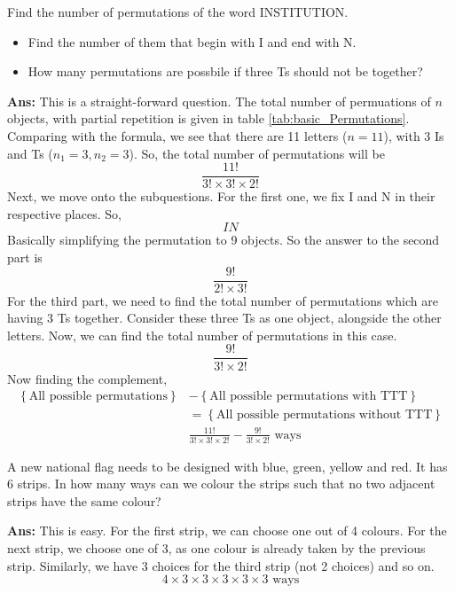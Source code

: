 \begin{example}
    Find the number of permutations of the word INSTITUTION.
    \begin{itemize}
        \item Find the number of them that begin with I and end with N.
        \item How many permutations are possbile if three Ts should not be together?
    \end{itemize}

    \textbf{Ans:} This is a straight-forward question. The total number of permuations of \mbox{$n$} objects, with partial repetition is given in table \ref{tab:basic_Permutations}. Comparing with the formula, we see that there are 11 letters (\mbox{$n=11$}), with 3 Is and Ts (\mbox{$n_1=3, n_2=3$}). So, the total number of permutations will be
    \[
        \frac{11!}{3!\times 3!\times 2!}
    \]
    Next, we move onto the subquestions. For the first one, we fix I and N in their respective places. So,
    \[
        \boxed{I}\boxed{}\boxed{}\boxed{}\boxed{}\boxed{}\boxed{}\boxed{}\boxed{}\boxed{}\boxed{N}
    \] Basically simplifying the permutation to 9 objects. So the answer to the second part is
    \[
        \frac{9!}{2! \times 3!}
    \]
    For the third part, we need to find the total number of permutations which are having 3 Ts together. Consider these three Ts as one object, alongside the other letters. Now, we can find the total number of permutations in this case.
    \[
        \frac{9!}{3!\times 2!}
    \]
    Now finding the complement,
    \begin{align*}
        \left\{\text{All possible permutations}\right\} & - \left\{\text{All possible permutations with TTT}\right\}             \\&= \left\{\text{All possible permutations without TTT}\right\} \\
                                                        & \frac{11!}{3!\times 3!\times 2!} - \frac{9!}{3!\times 2!} \text{ ways}
    \end{align*}
\end{example}

\begin{example}
    A new national flag needs to be designed with blue, green, yellow and red. It has 6 strips. In how many ways can we colour the strips such that no two adjacent strips have the same colour?

    \textbf{Ans:} This is easy. For the first strip, we can choose one out of 4 colours. For the next strip, we choose one of 3, as one colour is already taken by the previous strip. Similarly, we have 3 choices for the third strip (not 2 choices) and so on.
    \[
        4\times3\times3\times3\times3\times3\text{ ways}
    \]
\end{example}

